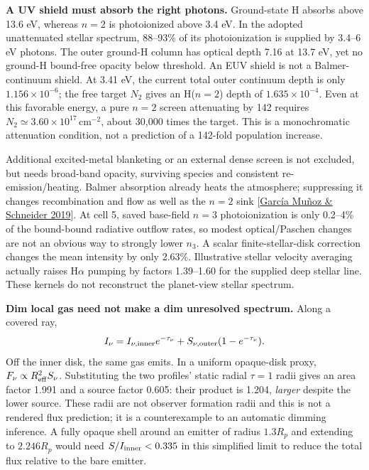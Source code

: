 \documentclass[10pt,a4paper]{article}
\begin{document}
\clearpage
\textbf{A UV shield must absorb the right photons.}
Ground-state H absorbs above 13.6 eV, whereas $n=2$ is photoionized above
3.4 eV. In the adopted unattenuated stellar spectrum, 88--93\% of its
photoionization is supplied by 3.4--6 eV photons. The outer ground-H column
has optical depth 7.16 at 13.7 eV, yet no ground-H bound-free opacity below
threshold. An EUV shield is not a Balmer-continuum shield.
At 3.41 eV, the current total outer continuum depth is only
$1.156\times10^{-6}$; the free target $N_2$ gives an H($n=2$) depth of
$1.635\times10^{-4}$. Even at this favorable energy, a pure $n=2$ screen
attenuating by 142 requires $N_2\simeq3.60\times10^{17}\,\mathrm{cm}^{-2}$,
about 30,000 times the target. This is a monochromatic attenuation condition,
not a prediction of a 142-fold population increase.

Additional excited-metal blanketing or an external dense screen is not
excluded, but needs broad-band opacity, surviving species and consistent
re-emission/heating. Balmer absorption already heats the atmosphere;
suppressing it changes recombination and flow as well as the $n=2$ sink
[\href{https://arxiv.org/html/1910.00267v1}{Garc\'ia Mu\~noz \& Schneider 2019}].
At cell 5, saved base-field $n=3$ photoionization is only 0.2--4\% of the bound-bound
radiative outflow rates, so modest optical/Paschen changes are not an obvious
way to strongly lower $n_3$. A scalar finite-stellar-disk correction changes
the mean intensity by only 2.63\%. Illustrative stellar velocity averaging
actually raises H$\alpha$ pumping by factors 1.39--1.60 for the supplied deep
stellar line. These kernels do not reconstruct the planet-view stellar spectrum.

\textbf{Dim local gas need not make a dim unresolved spectrum.}
Along a covered ray,
\[
 I_\nu=I_{\nu,\rm inner}e^{-\tau_\nu}
        +S_{\nu,\rm outer}(1-e^{-\tau_\nu}).
\]
Off the inner disk, the same gas emits. In a uniform opaque-disk proxy,
$F_\nu\propto R_{\rm eff}^2S_\nu$. Substituting the two profiles' static
radial $\tau=1$ radii gives an area factor 1.991 and a source factor 0.605:
their product is 1.204, \emph{larger} despite the lower source. These radii
are not observer formation radii and this is not a rendered flux prediction;
it is a counterexample to an automatic dimming inference. A fully opaque
shell around an emitter of radius $1.3R_p$ and extending to $2.246R_p$
would need $S/I_{\rm inner}<0.335$ in this simplified limit to reduce the
total flux relative to the bare emitter.
\end{document}
